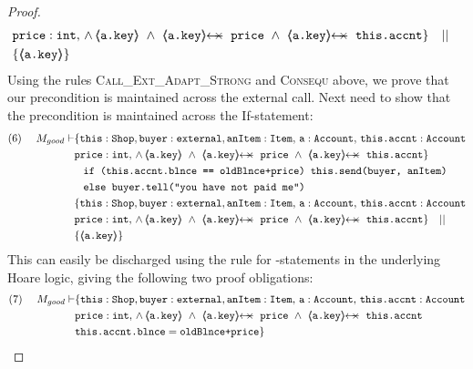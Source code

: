 \begin{proof}
\begin{align*}
				& \prg{price} : \prg{int},\,
				  \wedge\, 
				  {\inside{\prg{a.key}}}\ \wedge\ 
				  \protectedFrom{\prg{a.key}}{\prg{price}}\ \wedge\ 
				   \protectedFrom{\prg{a.key}}{\prg{this.accnt}}\} \ \ \  || \ \ \ \\
		  		& \{ {\inside{\prg{a.key}}} \}
\end{align*}
\normalsize
Using the rules \textsc{Call\_Ext\_Adapt\_Strong} and \textsc{Consequ} above, we prove that our precondition is maintained across the external call. 
Next need to show that the precondition is maintained across the If-statement:
\small
\begin{align*}
\text{(6)}  \ \ \ \ M_{good} \vdash & \{  \prg{this}:\prg{Shop}, \prg{buyer} : \prg{external}, \prg{anItem} : \prg{Item},\, \prg{a}:\prg{Account},\, \prg{this.accnt}:\prg{Account}\\
				& \prg{price} : \prg{int},\,
				  \wedge\, 
				  {\inside{\prg{a.key}}}\ \wedge\ 
				  \protectedFrom{\prg{a.key}}{\prg{price}}\ \wedge\ 
				   \protectedFrom{\prg{a.key}}{\prg{this.accnt}}\} \\
		  		&\;\;\; \prg{if (this.accnt.blnce == oldBlnce+price) this.send(buyer, anItem)}\ \\  
				&\;\;\;  \prg{else buyer.tell("you have not paid me")}\\
		  		& \{  \prg{this}:\prg{Shop}, \prg{buyer} : \prg{external}, \prg{anItem} : \prg{Item},\, \prg{a}:\prg{Account},\, \prg{this.accnt}:\prg{Account}\\
				& \prg{price} : \prg{int},\,
				  \wedge\, 
				  {\inside{\prg{a.key}}}\ \wedge\ 
				  \protectedFrom{\prg{a.key}}{\prg{price}}\ \wedge\ 
				   \protectedFrom{\prg{a.key}}{\prg{this.accnt}}\} \ \ \  || \ \ \ \\
		  		& \{ {\inside{\prg{a.key}}} \}
\end{align*}
\normalsize
This can easily be discharged using the rule for -statements in the underlying Hoare logic, giving the following two proof obligations:
\small
\begin{align*}
\text{(7)}  \ \ \ \ M_{good} \vdash & \{  \prg{this}:\prg{Shop}, \prg{buyer} : \prg{external}, \prg{anItem} : \prg{Item},\, \prg{a}:\prg{Account},\, \prg{this.accnt}:\prg{Account}\\
				& \prg{price} : \prg{int},\,
				  \wedge\, 
				  {\inside{\prg{a.key}}}\ \wedge\ 
				  \protectedFrom{\prg{a.key}}{\prg{price}}\ \wedge\ 
				   \protectedFrom{\prg{a.key}}{\prg{this.accnt}} \\
				& \prg{this.accnt.blnce} = \prg{oldBlnce+price}\} \\

\end{align*}
\end{proof}

